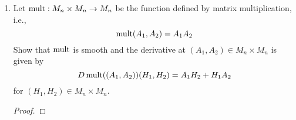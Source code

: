 \documentclass[../psets.tex]{subfiles}
\begin{document}
\begin{enumerate}
\begin{enumerate}
\begin{proof}
        \end{proof}
        \item Let $\operatorname{mult}:M_n\times M_n\to M_n$ be the function defined by matrix multiplication, i.e.,
        \begin{equation*}
            \operatorname{mult}(A_1,A_2) = A_1A_2
        \end{equation*}
        Show that $\operatorname{mult}$ is smooth and the derivative at $(A_1,A_2)\in M_n\times M_n$ is given by
        \begin{equation*}
            D\operatorname{mult}((A_1,A_2))(H_1,H_2) = A_1H_2+H_1A_2
        \end{equation*}
        for $(H_1,H_2)\in M_n\times M_n$.
        \begin{proof}




\end{proof}
\end{enumerate}
\end{enumerate}
\end{document}
